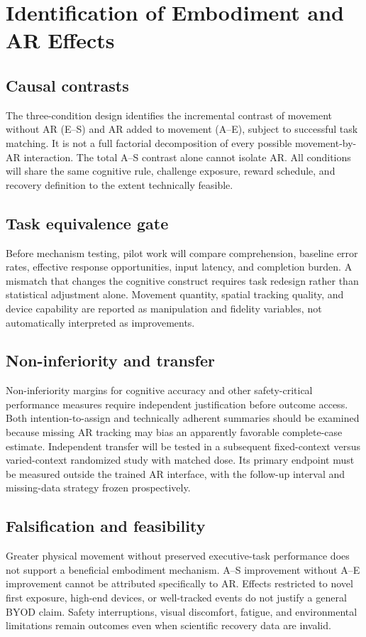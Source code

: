 \section{Identification of Embodiment and AR Effects}
\subsection{Causal contrasts}
The three-condition design identifies the incremental contrast of movement without AR (E--S) and AR added to movement (A--E), subject to successful task matching. It is not a full factorial decomposition of every possible movement-by-AR interaction. The total A--S contrast alone cannot isolate AR. All conditions will share the same cognitive rule, challenge exposure, reward schedule, and recovery definition to the extent technically feasible.

\subsection{Task equivalence gate}
Before mechanism testing, pilot work will compare comprehension, baseline error rates, effective response opportunities, input latency, and completion burden. A mismatch that changes the cognitive construct requires task redesign rather than statistical adjustment alone. Movement quantity, spatial tracking quality, and device capability are reported as manipulation and fidelity variables, not automatically interpreted as improvements.

\subsection{Non-inferiority and transfer}
Non-inferiority margins for cognitive accuracy and other safety-critical performance measures require independent justification before outcome access. Both intention-to-assign and technically adherent summaries should be examined because missing AR tracking may bias an apparently favorable complete-case estimate. Independent transfer will be tested in a subsequent fixed-context versus varied-context randomized study with matched dose. Its primary endpoint must be measured outside the trained AR interface, with the follow-up interval and missing-data strategy frozen prospectively.

\subsection{Falsification and feasibility}
Greater physical movement without preserved executive-task performance does not support a beneficial embodiment mechanism. A--S improvement without A--E improvement cannot be attributed specifically to AR. Effects restricted to novel first exposure, high-end devices, or well-tracked events do not justify a general BYOD claim. Safety interruptions, visual discomfort, fatigue, and environmental limitations remain outcomes even when scientific recovery data are invalid.